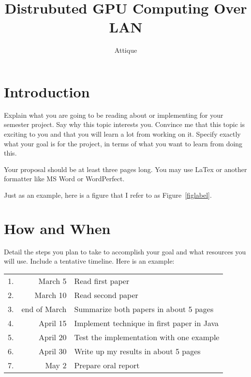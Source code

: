 \documentclass{article}
\begin{document}
\title{Distrubuted GPU Computing Over LAN}
\author{Attique}
\maketitle

\section{Introduction}

Explain what you are going to be reading about or implementing for
your semester project.  Say why this topic interests you.  Convince me
that this topic is exciting to you and that you will learn a lot from
working on it.  Specify exactly what your goal is for the project, in
terms of what you want to learn from doing this.

Your proposal should be at least three pages long.  You may use LaTex
or another formatter like MS Word or WordPerfect.

Just as an example, here is a figure that I refer to as
Figure~\ref{figlabel}.



\section{How and When}

Detail the  steps you plan  to take to  accomplish your goal  and what
resources you  will use.   Include a tentative  timeline.  Here  is an
example:

\begin{center}
\begin{tabular}{rrl}
1.  & March 5 & Read first paper\\
2.  & March 10 & Read second paper\\
3.  & end of March & Summarize both papers in about 5 pages\\
4.  & April 15 & Implement technique in first paper in Java\\
5.  & April 20 & Test the implementation with one example\\
6.  & April 30 & Write up my results in about 5 pages\\
7. & May 2 & Prepare oral report
\end{tabular}
\end{center}
\end{document}
